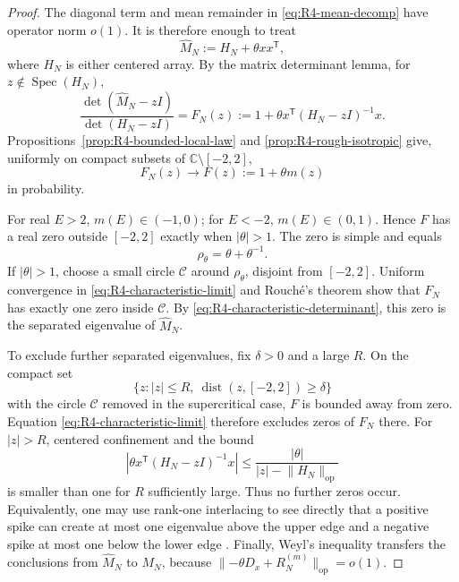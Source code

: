 \documentclass[11pt]{article}
\theoremstyle{definition}
\theoremstyle{remark}
\newcommand{\spec}{\operatorname{Spec}}
\newcommand{\op}{\mathrm{op}}
\newcommand{\norm}[1]{\lVert #1\rVert}
\begin{document}
\begin{proof}
The diagonal term and mean remainder in \eqref{eq:R4-mean-decomp} have
operator norm \(o(1)\).  It is therefore enough to treat
\[
 \widehat M_N:=H_N+\theta xx^{\mathsf T},
\]
where \(H_N\) is either centered array.  By the matrix determinant lemma,
for \(z\notin\spec(H_N)\),
\begin{equation}\label{eq:R4-characteristic-determinant}
 \frac{\det(\widehat M_N-zI)}{\det(H_N-zI)}
 =F_N(z):=1+\theta x^{\mathsf T}(H_N-zI)^{-1}x.
\end{equation}
Propositions~\ref{prop:R4-bounded-local-law} and
\ref{prop:R4-rough-isotropic} give, uniformly on compact subsets of
\(\mathbb C\setminus[-2,2]\),
\begin{equation}\label{eq:R4-characteristic-limit}
 F_N(z)\longrightarrow F(z):=1+\theta m(z)
\end{equation}
in probability.

For real \(E>2\), \(m(E)\in(-1,0)\); for \(E<-2\),
\(m(E)\in(0,1)\).  Hence \(F\) has a real zero outside \([-2,2]\) exactly
when \(|\theta|>1\).  The zero is simple and equals
\[
 \rho_\theta=\theta+\theta^{-1}.
\]
If \(|\theta|>1\), choose a small circle \(\mathcal C\) around
\(\rho_\theta\), disjoint from \([-2,2]\).  Uniform convergence in
\eqref{eq:R4-characteristic-limit} and Rouch\'e's theorem show that \(F_N\)
has exactly one zero inside \(\mathcal C\).  By
\eqref{eq:R4-characteristic-determinant}, this zero is the separated
eigenvalue of \(\widehat M_N\).

To exclude further separated eigenvalues, fix \(\delta>0\) and a large
\(R\).  On the compact set
\[
 \{z:|z|\le R,\ \operatorname{dist}(z,[-2,2])\ge\delta\}
\]
with the circle \(\mathcal C\) removed in the supercritical case, \(F\) is
bounded away from zero.  Equation \eqref{eq:R4-characteristic-limit} therefore
excludes zeros of \(F_N\) there.  For \(|z|>R\), centered confinement and the
bound
\[
 \left|\theta x^{\mathsf T}(H_N-zI)^{-1}x\right|
 \le\frac{|\theta|}{|z|-\norm{H_N}_{\op}}
\]
is smaller than one for \(R\) sufficiently large.  Thus no further zeros
occur.  Equivalently, one may use rank-one interlacing to see directly that a
positive spike can create at most one eigenvalue above the upper edge and a
negative spike at most one below the lower edge
\cite{BenaychGeorgesNadakuditi2011}.  Finally, Weyl's inequality transfers the
conclusions from \(\widehat M_N\) to \(M_N\), because
\(\norm{-\theta D_x+R_N^{(m)}}_{\op}=o(1)\).
\end{proof}
\end{document}
